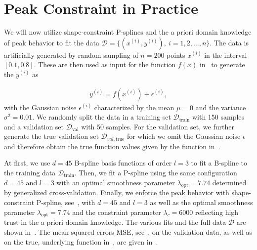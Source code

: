 \section{Peak Constraint in Practice} \label{sec:peak-behav-noisy}

We will now utilize shape-constraint P-splines and the a priori domain knowledge of peak behavior to fit the data $\mathcal{D} = \{(x^{(i)}, y^{(i)}), \ i=1,2,\dots,n\}$. The data is artificially generated by random sampling of $n=200$ points $x^{(i)}$ in the interval $[0.1, 0.8]$. These are then used as input for the function $f(x)$ in~ to generate the $y^{(i)}$ as

\begin{align}
	y^{(i)} = f(x^{(i)}) + \epsilon^{(i)},
\end{align}
%
with the Gaussian noise $\epsilon^{(i)}$ characterized by the mean $\mu = 0$ and the variance $\sigma^2 = 0.01$. We randomly split the data in a training set $\mathcal{D}_{\mathrm{train}}$ with 150 samples and a validation set $\mathcal{D}_{\mathrm{val}}$ with 50 samples.  For the validation set, we further generate the true validation set $\mathcal{D}_{val, \mathrm{true}}$ for which we omit the Gaussian noise $\epsilon$ and therefore obtain the true function values given by the function in~. 

At first, we use $d=45$ B-spline basis functions of order $l=3$ to fit a B-spline to the training data $\mathcal{D}_{\mathrm{train}}$. Then, we fit a P-spline using the same configuration $d=45$ and $l=3$ with an optimal smoothness parameter $\lambda_{\mathrm{opt}} = 7.74$ determined by generalized cross-validation. Finally, we enforce the peak behavior with shape-constraint P-spline, see~, with $d=45$ and $l=3$ as well as the optimal smoothness parameter $\lambda_{\mathrm{opt}}=7.74$ and the constraint parameter $\lambda_c=6000$ reflecting high trust in the a priori domain knowledge. The various fits and the full data $\mathcal D$ are shown in~. The mean squared errors MSE, see~, on the validation data, as well as on the true, underlying function in~, are given in~.


